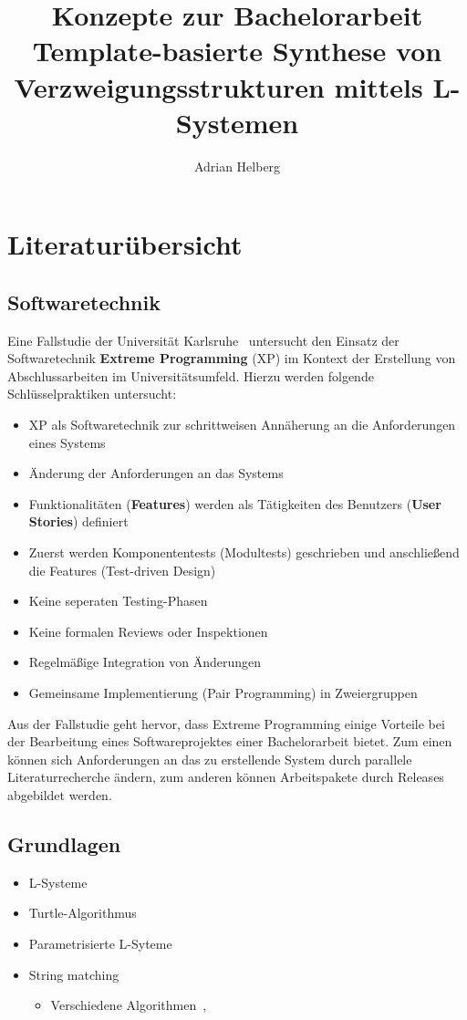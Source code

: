 \documentclass[11pt]{article}
\title{\textbf{Konzepte} zur Bachelorarbeit\\\large{Template-basierte Synthese von\\Verzweigungsstrukturen mittels
L-Systemen}}
\author{Adrian Helberg}
\begin{document}
    \maketitle
    \tableofcontents
    \newpage
    \section{Literaturübersicht}
    \subsection{Softwaretechnik}
    Eine Fallstudie der Universität Karlsruhe~\cite{1} untersucht den Einsatz der Softwaretechnik \textbf{Extreme
    Programming}
    (XP) im Kontext der Erstellung von Abschlussarbeiten im Universitätsumfeld.
    Hierzu werden folgende Schlüsselpraktiken untersucht:
    \begin{itemize}
        \item XP als Softwaretechnik zur schrittweisen Annäherung an die Anforderungen eines Systems
        \item Änderung der Anforderungen an das Systems
        \item Funktionalitäten (\textbf{Features}) werden als Tätigkeiten des Benutzers (\textbf{User Stories}) definiert
        \item Zuerst werden Komponententests (Modultests) geschrieben und anschließend die Features (Test-driven Design)
        \item Keine seperaten Testing-Phasen
        \item Keine formalen Reviews oder Inspektionen
        \item Regelmäßige Integration von Änderungen
        \item Gemeinsame Implementierung (Pair Programming) in Zweiergruppen
    \end{itemize}
    Aus der Fallstudie geht hervor, dass Extreme Programming einige Vorteile bei der Bearbeitung eines Softwareprojektes
    einer Bachelorarbeit bietet.
    Zum einen können sich Anforderungen an das zu erstellende System durch parallele Literaturrecherche ändern, zum
    anderen können Arbeitspakete durch Releases abgebildet werden.

    \subsection{Grundlagen}
    \begin{itemize}
        \item L-Systeme~\cite{3}
        \item Turtle-Algorithmus~\cite{4}
        \item Parametrisierte L-Syteme~\cite{5}
        \item String matching~\cite{6}
        \begin{itemize}
            \item Verschiedene Algorithmen~\cite{7},~\cite{8}
        \end{itemize}
    \end{itemize}
\end{document}
